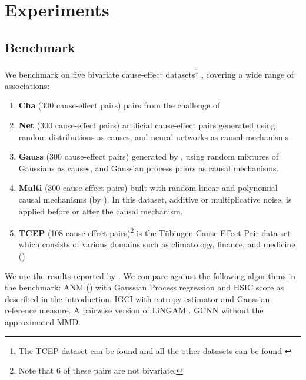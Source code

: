 \chapter{Experiments}


\section{Benchmark}

We benchmark on five bivariate cause-effect datasets\footnote{ The TCEP dataset 
can be found \href{https://webdav.tuebingen.mpg.de/cause-effect/}{\color{blue}{here}} and 
all the other datasets can be found 
\href{https://dataverse.harvard.edu/dataset.xhtml?persistentId=doi:10.7910/DVN/3757KX}{\color{blue}{here}}
}
, covering a wide range of associations:

\begin{enumerate}[noitemsep, topsep=0pt]

    \item \textbf{Cha} (300 cause-effect pairs) pairs from the challenge of \cite{chalearn}
    \item \textbf{Net} (300 cause-effect pairs) artificial cause-effect pairs generated using 
            random distributions as causes, and neural networks as causal mechanisms
    \item \textbf{Gauss} (300 cause-effect pairs) generated by \cite{Mooij2016jmlr}, using random 
      mixtures of Gaussians as causes, and Gaussian process priors as causal mechanisms.
    \item \textbf{Multi} (300 cause-effect pairs) built with random linear and 
    polynomial causal mechanisms (by \cite{goudet2017causal}). In this dataset, 
    additive or multiplicative noise, is applied before or after the causal mechanism.
    \item \textbf{TCEP} (108 cause-effect pairs)\footnote{Note that 6 of these pairs are not bivariate.} 
     is the Tübingen Cause Effect Pair data set which consists of various 
    domains such as climatology, finance, and medicine (\cite{Mooij2016jmlr}).

\end{enumerate}

We use the results reported by \cite{goudet2017causal}. We compare against the following algorithms
in the benchmark: ANM (\cite{Mooij2016jmlr}) with Gaussian Process regression and HSIC score as described 
in the introduction. IGCI \cite{daniusis2012inferring} with entropy estimator and Gaussian reference measure.
A  pairwise version of LiNGAM \cite{shimizu2011directlingam}. GCNN without the approximated MMD. 

